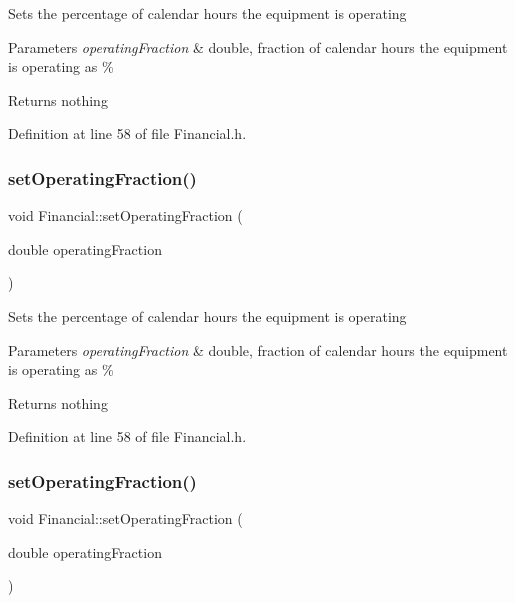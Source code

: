 Sets the percentage of calendar hours the equipment is operating


\begin{DoxyParams}{Parameters}
{\em operating\+Fraction} & double, fraction of calendar hours the equipment is operating as \%\\
\hline
\end{DoxyParams}
\begin{DoxyReturn}{Returns}
nothing 
\end{DoxyReturn}


Definition at line 58 of file Financial.\+h.

\mbox{\label{class_financial_a966250111b2f7a00d797a9d153ee8a83}} 
\subsubsection{\texorpdfstring{set\+Operating\+Fraction()}{setOperatingFraction()}\hspace{0.1cm}{\footnotesize\ttfamily [2/3]}}
{\footnotesize\ttfamily void Financial\+::set\+Operating\+Fraction (\begin{DoxyParamCaption}\item[{double}]{operating\+Fraction }\end{DoxyParamCaption})\hspace{0.3cm}{\ttfamily [inline]}}

Sets the percentage of calendar hours the equipment is operating


\begin{DoxyParams}{Parameters}
{\em operating\+Fraction} & double, fraction of calendar hours the equipment is operating as \%\\
\hline
\end{DoxyParams}
\begin{DoxyReturn}{Returns}
nothing 
\end{DoxyReturn}


Definition at line 58 of file Financial.\+h.

\mbox{\label{class_financial_a966250111b2f7a00d797a9d153ee8a83}} 
\subsubsection{\texorpdfstring{set\+Operating\+Fraction()}{setOperatingFraction()}\hspace{0.1cm}{\footnotesize\ttfamily [3/3]}}
{\footnotesize\ttfamily void Financial\+::set\+Operating\+Fraction (\begin{DoxyParamCaption}\item[{double}]{operating\+Fraction }\end{DoxyParamCaption})\hspace{0.3cm}{\ttfamily [inline]}}

